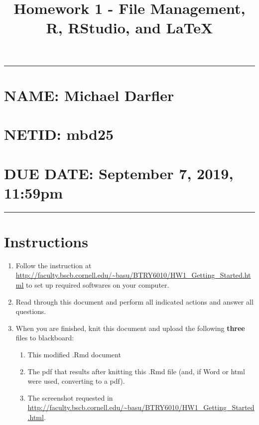 \documentclass[]{article}
\title{Homework 1 - File Management, R, RStudio, and LaTeX}
\author{}
\date{}
\providecommand{\tightlist}{%
  \setlength{\itemsep}{0pt}\setlength{\parskip}{0pt}}
\begin{document}
\maketitle

\begin{center}\rule{0.5\linewidth}{\linethickness}\end{center}

\hypertarget{name-michael-darfler}{%
\section{NAME: Michael Darfler}\label{name-michael-darfler}}

\hypertarget{netid-mbd25}{%
\section{NETID: mbd25}\label{netid-mbd25}}

\hypertarget{due-date-september-7-2019-1159pm}{%
\section{\texorpdfstring{\textbf{DUE DATE: September 7, 2019,
11:59pm}}{DUE DATE: September 7, 2019, 11:59pm}}\label{due-date-september-7-2019-1159pm}}

\begin{center}\rule{0.5\linewidth}{\linethickness}\end{center}

\hypertarget{instructions}{%
\section{Instructions}\label{instructions}}

\begin{enumerate}
\def\labelenumi{\arabic{enumi})}
\setcounter{enumi}{-1}
\item
  Follow the instruction at
  \url{http://faculty.bscb.cornell.edu/~basu/BTRY6010/HW1_Getting_Started.html}
  to set up required softwares on your computer.
\item
  Read through this document and perform all indicated actions and
  answer all questions.
\item
  When you are finished, knit this document and upload the following
  \textbf{three} files to blackboard:

  \begin{enumerate}
  \def\labelenumii{\alph{enumii}.}
  \tightlist
  \item
    This modified .Rmd document
  \item
    The pdf that results after knitting this .Rmd file (and, if Word or
    html were used, converting to a pdf).
  \item
    The screenshot requested in
    \url{http://faculty.bscb.cornell.edu/~basu/BTRY6010/HW1_Getting_Started.html}.
  \end{enumerate}
\end{enumerate}
\end{document}
